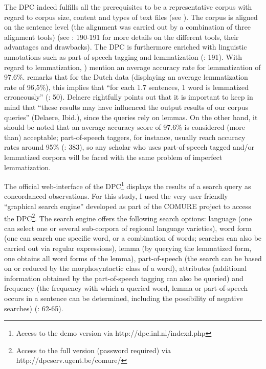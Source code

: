 The DPC indeed fulfills all the prerequisites to be a representative corpus with regard to corpus size, content and types of text files (see ). The corpus is aligned on the sentence level (the alignment was carried out by a combination of three alignment tools) (see \citealt{spyns_dutch_2013}: 190-191 for more details on the different tools, their advantages and drawbacks). The DPC is furthermore enriched with linguistic annotations such as part-of-speech tagging and lemmatization (\citealt{spyns_dutch_2013}: 191). With regard to lemmatization, \citet[384]{macken_dutch_2011}) mention an average accuracy rate for lemmatization of 97.6\%. \citet[50]{delaere_translations_2015} remarks that for the Dutch data (displaying an average lemmatization rate of 96,5\%), this implies that “for each 1.7 sentences, 1 word is lemmatized erroneously” (\citealt{delaere_translations_2015}: 50). Delaere rightfully points out that it is important to keep in mind that “these results may have influenced the output results of our corpus queries” (Delaere, Ibid.), since the queries rely on lemmas. On the other hand, it should be noted that an average accuracy score of 97.6\% is considered (more than) acceptable; part-of-speech taggers, for instance, usually reach accuracy rates around 95\% (\citealt{macken_dutch_2011}: 383), so any scholar who uses part-of-speech tagged and/or lemmatized corpora will be faced with the same problem of imperfect lemmatization.



The official web-interface of the DPC\footnote{Access to the demo version via http://dpc.inl.nl/indexd.php} displays the results of a search query as concordanced observations. For this study, I used the very user friendly “graphical search engine” developed as part of the COMURE project to access the DPC\footnote{Access to the full version (password required) via http://dpcserv.ugent.be/comure/}. The search engine offers the following search options: language (one can select one or several sub-corpora of regional language varieties), word form (one can search one specific word, or a combination of words; searches can also be carried out via regular expressions), lemma (by querying the lemmatized form, one obtains all word forms of the lemma), part-of-speech (the search can be based on or reduced by the morphosyntactic class of a word), attributes (additional information obtained by the part-of-speech tagging can also be queried) and frequency (the frequency with which a queried word, lemma or part-of-speech occurs in a sentence can be determined, including the possibility of negative searches) (\citealt{delaere_translations_2015}: 62-65).



